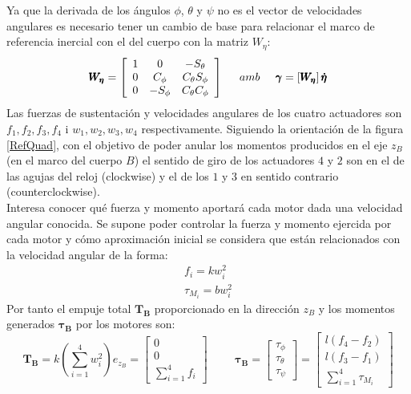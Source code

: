 \documentclass[twoside]{article}
\begin{document}
Ya que la derivada de los ángulos $\phi$, $\theta$ y $\psi$ no es el vector de velocidades angulares es necesario tener un cambio de base para relacionar el marco de referencia inercial con el del cuerpo con la matriz $W_\eta$:
\begin{equation}
\pmb{W_\eta}=\left[\begin{array}{ccc}
1 & 0 & -S_\theta \\
0 & C_\phi & C_\theta S_\phi \\
0 & -S_\phi & C_\theta C_\phi 
\end{array} \right] \hspace{0.5cm} amb \hspace{0.5cm} 
\pmb{\gamma}=\left[ \pmb{W_\eta} \right] \pmb{\dot{\eta}} 
\end{equation}
Las fuerzas de sustentación y velocidades angulares de los cuatro actuadores son $f_1,f_2,f_3,f_4$ i $w_1,w_2,w_3,w_4$ respectivamente. Siguiendo la orientación de la figura \ref{RefQuad}, con el objetivo de poder anular los momentos producidos en el eje $z_B$ (en el marco del cuerpo $B$) el sentido de giro de los actuadores  $4$ y $2$ son en el de las agujas del reloj (clockwise) y el de los $1$ y $3$ en sentido contrario (counterclockwise). \\

Interesa conocer qué fuerza y momento aportará cada motor dada una velocidad angular conocida. Se supone poder controlar la fuerza y momento ejercida por cada motor y cómo aproximación inicial se considera que están relacionados con la velocidad angular de la forma:
\begin{equation}
\begin{array}{l}
f_i=kw^2_i \\ 
\tau_{M_i}=bw^2_i
\end{array}
\end{equation}
Por tanto el empuje total $\pmb{T_B}$ proporcionado en la dirección $z_B$ y los momentos generados $\pmb{\tau_B}$ por los motores son:
\begin{equation}
\pmb{T_B}=k\left(\sum_{i=1}^{4}w^2_i \right)e_{z_B}=\left[ \begin{array}{c}
0 \\
0 \\
\displaystyle\sum_{i=1}^{4}f_i
\end{array} \right] 
\hspace{1cm} \pmb{\tau_B}=\left[ \begin{array}{c}
\tau_\phi \\
\tau_\theta \\
\tau_\psi
\end{array} \right] = \left[ \begin{array}{c}
l(f_4 - f_2) \\
l(f_3 - f_1) \\
\displaystyle\sum_{i=1}^{4}\tau_{M_i}
\end{array} \right]
\end{equation}
\end{document}
